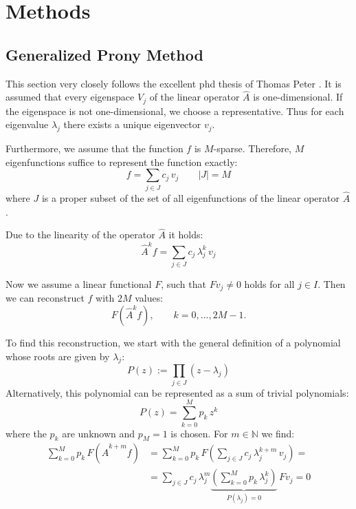 \chapter{Methods}\label{chapter:methods}

\section{Generalized Prony Method}

This section very closely follows the excellent phd thesis of Thomas Peter \cite{gen_prony_2013}.
It is assumed that every eigenspace $V_j$ of the linear operator $\hat{A}$ is one-dimensional. 
If the eigenspace is not one-dimensional, we choose a representative.
Thus for each eigenvalue $\lambda_j$ there exists a unique eigenvector $v_j$.

Furthermore, we assume that the function $f$ is $M$-sparse. Therefore, $M$ eigenfunctions suffice to represent the function exactly:
\begin{equation*}
    f = \sum_{j \in J} c_j\, v_j \qquad |J| = M
\end{equation*}
where $J$ is a proper subset of the set of all eigenfunctions of the linear operator $\hat{A}$.

Due to the linearity of the operator $\hat{A}$ it holds:
\begin{equation*}
    \hat{A}^k f = \sum_{j \in J} c_j\, \lambda_j^{k}\, v_j
\end{equation*}

Now we assume a linear functional $F$, such that $F v_j \neq 0$ holds for all $j \in I$. 
Then we can reconstruct $f$ with $2M$ values:
\begin{equation*}
    F(\hat{A}^k f), \qquad k = 0, \dots, 2M-1.
\end{equation*}

To find this reconstruction, we start with the general definition of a polynomial whose roots are given by $\lambda_j$:
\begin{equation*}
    P(z) := \prod_{j \in J} (z - \lambda_j)
\end{equation*}
Alternatively, this polynomial can be represented as a sum of trivial polynomials:
\begin{equation*}
    P(z) = \sum_{k=0}^{M} p_k\, z^{k}
\end{equation*}
where the $p_k$ are unknown and $p_M = 1$ is chosen. For $m \in \mathbb{N}$ we find:
\begin{align*}
    \sum_{k=0}^{M} p_k\, F(\hat{A}^{k+m} f) &= \sum_{k=0}^{M} p_k\, F\left( \sum_{j \in J} c_j\, \lambda_j^{k+m}\, v_j \right) = \\
    &= \sum_{j \in J} c_j\, \lambda_j^{m} \underbrace{\left( \sum_{k=0}^{M} p_k\, \lambda_j^{k} \right)}_{P(\lambda_j) = 0}\, F v_j = 0
\end{align*}

